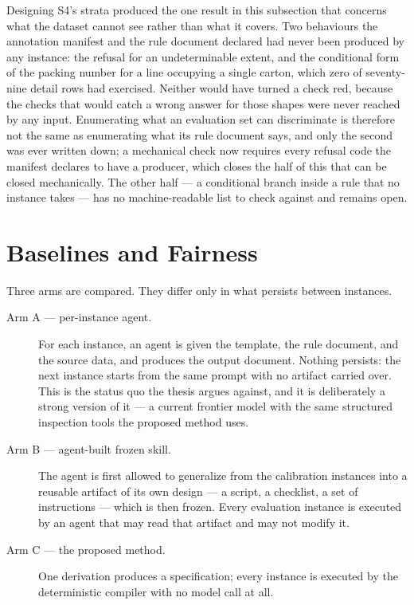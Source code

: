 Designing S4's strata produced the one result in this subsection that concerns what the
dataset cannot see rather than what it covers. Two behaviours the annotation manifest
and the rule document declared had never been produced by any instance: the refusal for an
undeterminable extent, and the conditional form of the packing number for a line occupying a
single carton, which zero of seventy-nine detail rows had exercised. Neither would have
turned a check red, because the checks that would catch a wrong answer for those shapes were
never reached by any input. Enumerating what an evaluation set can discriminate is therefore
not the same as enumerating what its rule document says, and only the second was ever written
down; a mechanical check now requires every refusal code the manifest declares to have a
producer, which closes the half of this that can be closed mechanically. The other half ---
a conditional branch inside a rule that no instance takes --- has no machine-readable list to
check against and remains open.

\section{Baselines and Fairness}
\label{sec:eval:baselines}

Three arms are compared. They differ only in what persists between instances.

\begin{description}
  \item[Arm A --- per-instance agent.] For each instance, an agent is given the template, the
    rule document, and the source data, and produces the output document. Nothing persists:
    the next instance starts from the same prompt with no artifact carried over. This is the
    status quo the thesis argues against, and it is deliberately a strong version of it ---
    a current frontier model with the same structured inspection tools the proposed method
    uses.
  \item[Arm B --- agent-built frozen skill.] The agent is first allowed to generalize from
    the calibration instances into a reusable artifact of its own design --- a script, a
    checklist, a set of instructions --- which is then frozen. Every evaluation instance is
    executed by an agent that may read that artifact and may not modify it.
  \item[Arm C --- the proposed method.] One derivation produces a specification; every
    instance is executed by the deterministic compiler with no model call at all.
\end{description}

